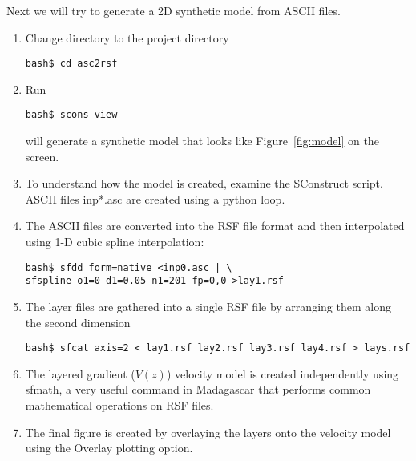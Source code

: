 Next we will try to generate a 2D synthetic model from ASCII files.
\begin{enumerate}
\item Change directory to the project directory
\begin{verbatim}
bash$ cd asc2rsf
\end{verbatim}
\item Run
\begin{verbatim}
bash$ scons view
\end{verbatim}
will generate a synthetic model that looks like Figure~\ref{fig:model}
on the screen.
\item To understand how the model is created, examine the SConstruct
  script. ASCII files inp*.asc are created using a python loop.
\item The ASCII files are converted into the RSF file format and then 
interpolated using 1-D cubic spline interpolation:
\begin{verbatim}
bash$ sfdd form=native <inp0.asc | \
sfspline o1=0 d1=0.05 n1=201 fp=0,0 >lay1.rsf
\end{verbatim}
\item The layer files are gathered into a single RSF file by arranging
  them along the second dimension
\begin{verbatim}
bash$ sfcat axis=2 < lay1.rsf lay2.rsf lay3.rsf lay4.rsf > lays.rsf
\end{verbatim}
\item The layered gradient ($V(z)$) velocity model is created
  independently using sfmath, a very useful command in Madagascar that
  performs common mathematical operations on RSF files.
\item The final figure is created by overlaying the layers onto the
  velocity model using the Overlay plotting option.
\end{enumerate}

